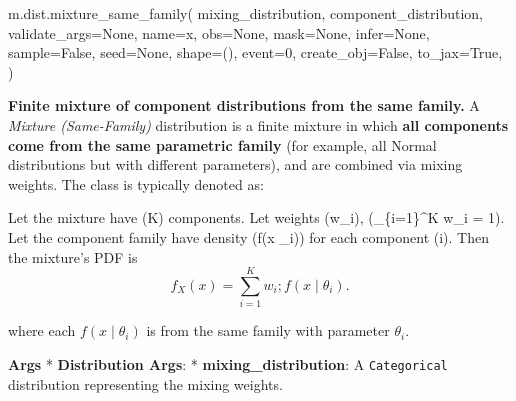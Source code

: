 \documentclass[
  letterpaper,
  DIV=11,
  numbers=noendperiod]{scrartcl}
\newenvironment{Shaded}{\begin{snugshade}}{\end{snugshade}}
\newcommand{\DecValTok}[1]{\textcolor[rgb]{0.68,0.00,0.00}{#1}}
\newcommand{\NormalTok}[1]{\textcolor[rgb]{0.00,0.23,0.31}{#1}}
\newcommand{\OperatorTok}[1]{\textcolor[rgb]{0.37,0.37,0.37}{#1}}
\newcommand{\StringTok}[1]{\textcolor[rgb]{0.13,0.47,0.30}{#1}}
\newcommand{\VariableTok}[1]{\textcolor[rgb]{0.07,0.07,0.07}{#1}}
\begin{document}
\begin{Shaded}
\begin{Highlighting}[]
\NormalTok{m.dist.mixture\_same\_family(}
\NormalTok{    mixing\_distribution,}
\NormalTok{    component\_distribution,}
\NormalTok{    validate\_args}\OperatorTok{=}\VariableTok{None}\NormalTok{,}
\NormalTok{    name}\OperatorTok{=}\StringTok{\textquotesingle{}x\textquotesingle{}}\NormalTok{,}
\NormalTok{    obs}\OperatorTok{=}\VariableTok{None}\NormalTok{,}
\NormalTok{    mask}\OperatorTok{=}\VariableTok{None}\NormalTok{,}
\NormalTok{    infer}\OperatorTok{=}\VariableTok{None}\NormalTok{,}
\NormalTok{    sample}\OperatorTok{=}\VariableTok{False}\NormalTok{,}
\NormalTok{    seed}\OperatorTok{=}\VariableTok{None}\NormalTok{,}
\NormalTok{    shape}\OperatorTok{=}\NormalTok{(),}
\NormalTok{    event}\OperatorTok{=}\DecValTok{0}\NormalTok{,}
\NormalTok{    create\_obj}\OperatorTok{=}\VariableTok{False}\NormalTok{,}
\NormalTok{    to\_jax}\OperatorTok{=}\VariableTok{True}\NormalTok{,}
\NormalTok{)}
\end{Highlighting}
\end{Shaded}

\textbf{Finite mixture of component distributions from the same family.}
A \emph{Mixture (Same-Family)} distribution is a finite mixture in which
\textbf{all components come from the same parametric family} (for
example, all Normal distributions but with different parameters), and
are combined via mixing weights. The class is typically denoted as:

Let the mixture have (K) components. Let weights (w\_i),
(\sum\_\{i=1\}\^{}K w\_i = 1). Let the component family have density
(f(x \mid \theta\_i)) for each component (i). Then the mixture's PDF is
\[
f_X(x) = \sum_{i=1}^K w_i ; f(x \mid \theta_i).
\]

where each \(f(x \mid \theta_i)\) is from the same family with parameter
\(\theta_i\).

\textbf{Args} * \textbf{Distribution Args}: *
\textbf{mixing\_distribution}: A \texttt{Categorical} distribution
representing the mixing weights.
\end{document}
